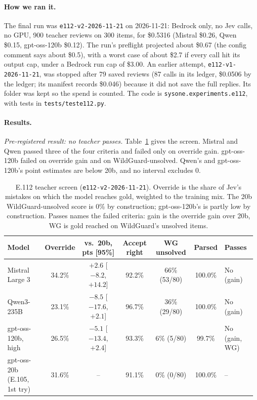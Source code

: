 \documentclass[11pt]{article}
\renewcommand{\_}{\origunderscore\allowbreak}
\begin{document}
\paragraph{How we ran it.}
The final run was \texttt{e112-v2-2026-11-21} on 2026-11-21: Bedrock only, no Jev calls, no GPU, 900 teacher reviews on 300 items, for \$0.5316 (Mistral \$0.26, Qwen \$0.15, gpt-oss-120b \$0.12). The run's preflight projected about \$0.67 (the config comment says about \$0.5), with a worst case of about \$2.7 if every call hit its output cap, under a Bedrock run cap of \$3.00. An earlier attempt, \texttt{e112-v1-2026-11-21}, was stopped after 79 saved reviews (87 calls in its ledger, \$0.0506 by the ledger; its manifest records \$0.046) because it did not save the full replies. Its folder was kept so the spend is counted. The code is \texttt{sysone.experiments.e112}, with tests in \texttt{tests/test\_e112.py}.

\paragraph{Results.}
\emph{Pre-registered result: no teacher passes.} Table~\ref{tab:e112-main} gives the screen. Mistral and Qwen passed three of the four criteria and failed only on override gain. gpt-oss-120b failed on override gain and on WildGuard-unsolved. Qwen's and gpt-oss-120b's point estimates are below 20b, and no interval excludes 0.

\begin{table}[H]
\centering
\small
\setlength{\tabcolsep}{4pt}
\begin{tabularx}{\textwidth}{@{}p{2.7cm} c c c c c X@{}}
\toprule
Model & Override & vs.\ 20b, pts [95\%] & Accept right & WG unsolved & Parsed & Passes \\
\midrule
Mistral Large 3 & 34.2\% & $+2.6$ [$-8.2$, $+14.2$] & 92.2\% & 66\% (53/80) & 100.0\% & No (gain) \\
Qwen3-235B & 23.1\% & $-8.5$ [$-17.6$, $+2.1$] & 96.7\% & 36\% (29/80) & 100.0\% & No (gain) \\
gpt-oss-120b, high & 26.5\% & $-5.1$ [$-13.4$, $+2.4$] & 93.3\% & 6\% (5/80) & 99.7\% & No (gain, WG) \\
gpt-oss-20b (E.105, 1st try) & 31.6\% & -- & 91.1\% & 0\% (0/80) & 100.0\% & -- \\
\bottomrule
\end{tabularx}
\caption{E.112 teacher screen (\texttt{e112-v2-2026-11-21}). Override is the share of Jev's mistakes on which the model reaches gold, weighted to the training mix. The 20b WildGuard-unsolved score is 0\% by construction; gpt-oss-120b's is partly low by construction. Passes names the failed criteria: gain is the override gain over 20b, WG is gold reached on WildGuard's unsolved items.}
\label{tab:e112-main}
\end{table}
\end{document}
